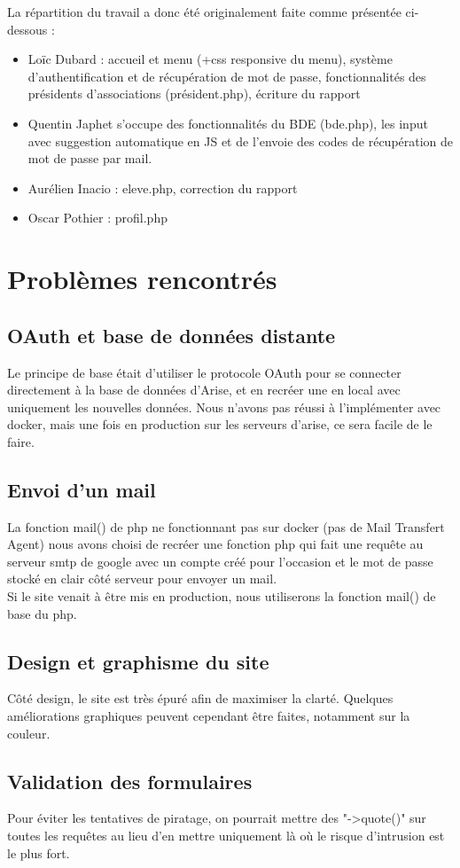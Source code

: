 \documentclass[french]{article}
\begin{document}
La répartition du travail a donc été originalement faite comme présentée ci-dessous : \\

\begin{itemize}
	\item Loïc Dubard : accueil et menu (+css responsive du menu), système d'authentification et de récupération de mot de passe, fonctionnalités des présidents d'associations (président.php), écriture du rapport\\ 
	\item Quentin Japhet s'occupe des fonctionnalités du BDE (bde.php), les input avec suggestion automatique en JS et de l'envoie des codes de récupération de mot de passe par mail. \\
	\item Aurélien Inacio : eleve.php, correction du rapport\\
	\item Oscar Pothier : profil.php\\
\end{itemize}

\section{Problèmes rencontrés}
\subsection{OAuth et base de données distante}
Le principe de base était d'utiliser le protocole OAuth pour se connecter directement à la base de données d'Arise, et en recréer une en local avec uniquement les nouvelles données. Nous n'avons pas réussi à l'implémenter avec docker, mais une fois en production sur les serveurs d'arise, ce sera facile de le faire.  

\subsection{Envoi d'un mail}
La fonction mail() de php ne fonctionnant pas sur docker (pas de Mail Transfert Agent) nous avons choisi de recréer une fonction php qui fait une requête au serveur smtp de google avec un compte créé pour l'occasion et le mot de passe stocké en clair côté serveur pour envoyer un mail.\\

Si le site venait à être mis en production, nous utiliserons la fonction mail() de base du php.\\

\subsection{Design et graphisme du site}
Côté design, le site est très épuré afin de maximiser la clarté. Quelques améliorations graphiques peuvent cependant être faites, notamment sur la couleur. 
\subsection{Validation des formulaires}
Pour éviter les tentatives de piratage, on pourrait mettre des "->quote()" sur toutes les requêtes au lieu d'en mettre uniquement là où le risque d'intrusion est le plus fort.  
\end{document}
